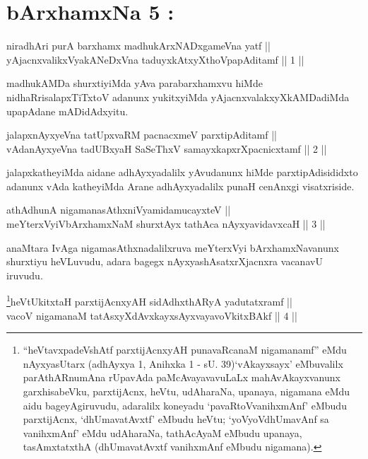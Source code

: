
\chapter{bArxhamxNa 5 :}


\begin{shl}
niradhAri purA barxhamx madhukArxNADxgameVna yatf || \\
yAjacnxvalikxVyakANeDxVna taduyxkAtxyX\s thoVpapAditamf \hfill || 1 ||  
\end{shl}

\begin{artha}
madhukAMDa shurxtiyiMda yAva parabarxhamxvu hiMde nidhaRrisalapxTiTxtoV adanunx yukitxyiMda yAjacnxvalakxyXkAMDadiMda upapAdane mADidAdxyitu.
\end{artha}

\begin{shl}
jalapxnAyxyeVna tatUpxvaRM pacnacxmeV parxtipAditamf || \\
vAdanAyxyeVna tadUBxyaH SaSeThxV samayxkapxrXpacnicxtamf \hfill || 2 ||  
\end{shl}

\begin{artha}
jalapxkatheyiMda aidane adhAyxyadalilx yAvudanunx hiMde parxtipAdisididxto adanunx vAda katheyiMda Arane adhAyxyadalilx punaH cenAnxgi visatxriside.
\end{artha}

\begin{shl}
athAdhunA nigamanasAthxniVyamidamucayxteV || \\
meYterxVyiVbArxhamxNaM shurxtAyx tathAca nAyxyavidavxcaH \hfill || 3 ||  
\end{shl}

\begin{artha}
anaMtara IvAga nigamasAthxnadalilxruva meYterxVyi bArxhamxNavanunx shurxtiyu heVLuvudu, adara bagegx nAyxyashAsatxrXjacnxra vacanavU iruvudu.
\end{artha}



\begin{shl}
\footnote{``heVtavxpadeVshAtf parxtijAcnxyAH punavaRcanaM nigamanamf'' eMdu nAyxyasUtarx (adhAyxya 1, Anihxka 1 - sU. 39)`vAkayxsayx' eMbuvalilx parAthARnumAna rUpavAda paMcAvayavavuLaLx mahAvAkayxvanunx garxhisabeVku, parxtijAcnx, heVtu, udAharaNa, upanaya, nigamana eMdu aidu bageyAgiruvudu, adaralilx koneyadu `pavaRtoVvanihxmAnf' eMbudu parxtijAcnx, `dhUmavatAvxtf' eMbudu heVtu; `yoVyoVdhUmavAnf sa vanihxmAnf' eMdu udAharaNa, tathAcAyaM eMbudu upanaya, tasAmxtatxthA (dhUmavatAvxtf vanihxmAnf eMbudu nigamana).}heVtUkitxtaH parxtijAcnxyAH sidAdhxthARyA yadutatxramf || \\
vacoV nigamanaM tatAsxyXdAvxkayxsAyxvayavoVkitxBAkf \hfill || 4 ||  
\end{shl}

